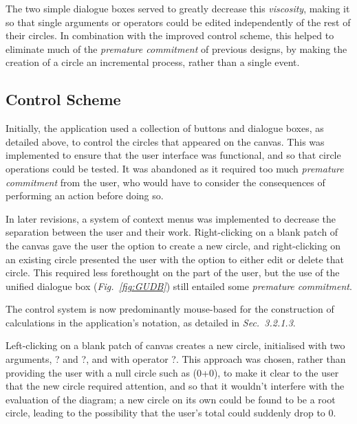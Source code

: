 \documentclass[12pt,twoside,notitlepage,xetex]{report}
\begin{document}
The two simple dialogue boxes served to greatly decrease this \emph{viscosity}, making it so that single arguments or operators could be edited independently of the rest of their circles.  In combination with the improved control scheme, this helped to eliminate much of the \emph{premature commitment} of previous designs, by making the creation of a circle an incremental process, rather than a single event.

\subsection{Control Scheme}


Initially, the application used a collection of buttons and dialogue boxes, as detailed above, to control the circles that appeared on the canvas.  This was implemented to ensure that the user interface was functional, and so that circle operations could be tested.  It was abandoned as it required too much \emph{premature commitment} from the user, who would have to consider the consequences of performing an action before doing so.

In later revisions, a system of context menus was implemented to decrease the separation between the user and their work.  Right-clicking on a blank patch of the canvas gave the user the option to create a new circle, and right-clicking on an existing circle presented the user with the option to either edit or delete that circle.  This required less forethought on the part of the user, but the use of the unified dialogue box (\emph{Fig.~\ref{fig:GUDB}}) still entailed some \emph{premature commitment}.

The control system is now predominantly mouse-based for the construction of calculations in the application's notation, as detailed in \emph{Sec.~3.2.1.3}.

Left-clicking on a blank patch of canvas creates a new circle, initialised with two arguments, {\sfapp ?} and {\sfapp ?}, and with operator {\sfapp ?}.  This approach was chosen, rather than providing the user with a null circle such as (0+0), to make it clear to the user that the new circle required attention, and so that it wouldn't interfere with the evaluation of the diagram; a new circle on its own could be found to be a root circle, leading to the possibility that the user's total could suddenly drop to 0.
\end{document}
